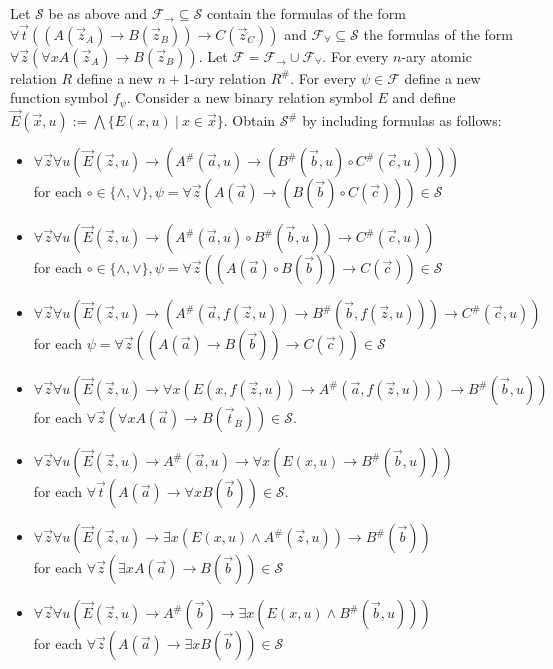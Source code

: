 \documentclass[a4paper,UKenglish,cleveref, autoref, thm-restate]{lipics-v2021}
\begin{document}
\begin{theorem}\label{fullFOtranslation}
	Let $\mathcal S$ be as above and $\mathcal F_\to\subseteq\mathcal S$ contain the formulas of the form $\forall \vec t((A(\vec z_A)\to B(\vec z_B))\to C(\vec z_C))$ and $\mathcal F_\forall\subseteq\mathcal S$ the formulas of the form $\forall \vec z(\forall xA(\vec z_A)\to B(\vec z_B))$. Let $\mathcal F = \mathcal F_\to\cup\mathcal F_\forall$. For every $n$-ary atomic relation $R$ define a new $n+1$-ary relation $R^\#$. For every $\psi\in\mathcal F$ define a new function symbol $f_\psi$. Consider a new binary relation symbol $E$ and define $\vec E(\vec x, u) := \bigwedge\{E(x, u)\:|\:x\in\vec x\}$. Obtain $\mathcal S^\#$ by including formulas as follows:
	\begin{itemize}
		\item $\forall \vec z\forall u(\vec E(\vec z, u)\to (A^\#(\vec a, u)\to (B^\#(\vec b, u)\circ C^\#(\vec c, u))))$\\for each $\circ\in\{\wedge, \vee\}, \psi = \forall \vec z(A(\vec a)\to (B(\vec b)\circ C(\vec c)))\in\mathcal S$
		\item $\forall \vec z\forall u(\vec E(\vec z, u)\to (A^\#(\vec a, u)\circ B^\#(\vec b, u))\to C^\#(\vec c, u))$\\for each $\circ\in\{\wedge, \vee\}, \psi = \forall \vec z((A(\vec a)\circ B(\vec b))\to C(\vec c))\in\mathcal S$
		\item $\forall \vec z\forall u(\vec E(\vec z, u)\to(A^\#(\vec a, f(\vec z, u))\to B^\#(\vec b, f(\vec z, u)))\to C^\#(\vec c, u))$ for each $\psi = \forall \vec z((A(\vec a)\to B(\vec b))\to C(\vec c))\in\mathcal S$
		\item  $\forall \vec z\forall u(\vec E(\vec z, u)\to \forall x(E(x, f(\vec z, u))\to A^\#(\vec a, f(\vec z, u)))\to B^\#(\vec b, u))$\\for each $\forall \vec z(\forall xA(\vec a)\to B(\vec t_B))\in\mathcal S$.
		\item $\forall \vec z\forall u(\vec E(\vec z, u)\to A^\#(\vec a, u)\to \forall x(E(x, u)\to B^\#(\vec b, u)))$\\for each $\forall \vec t(A(\vec a)\to \forall xB(\vec b))\in\mathcal S$.
		\item $\forall \vec z\forall u(\vec E(\vec z, u)\to \exists x(E(x, u)\wedge A^\#(\vec z, u))\to B^\#(\vec b))$\\for each $\forall \vec z(\exists xA(\vec a)\to B(\vec b))\in\mathcal S$
		\item $\forall \vec z\forall u(\vec E(\vec z, u)\to A^\#(\vec b)\to \exists x(E(x, u)\wedge B^\#(\vec b, u)))$\\for each $\forall \vec z(A(\vec a)\to \exists xB(\vec b))\in\mathcal S$

\end{itemize}
\end{theorem}
\end{document}
